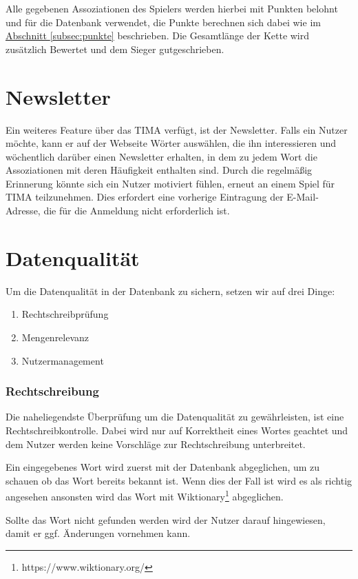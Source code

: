 Alle gegebenen Assoziationen des Spielers werden hierbei mit Punkten belohnt
und für die Datenbank verwendet, die Punkte berechnen sich dabei wie im \hyperref[subsec:punkte]{Abschnitt \ref*{subsec:punkte}} beschrieben. Die Gesamtlänge der Kette wird zusätzlich Bewertet und dem Sieger gutgeschrieben.

\section{Newsletter}\label{subsec:newsletter}
Ein weiteres Feature über das TIMA verfügt, ist der Newsletter. Falls ein
Nutzer möchte, kann er auf der Webseite Wörter auswählen, die ihn
interessieren und wöchentlich darüber einen Newsletter erhalten, in dem zu
jedem Wort die Assoziationen mit deren Häufigkeit enthalten sind. Durch die
regelmäßig Erinnerung könnte sich ein Nutzer motiviert fühlen, erneut an einem
Spiel für TIMA teilzunehmen. Dies erfordert eine vorherige Eintragung der E-Mail-Adresse, die für die Anmeldung nicht erforderlich ist.

\section{Datenqualität}
Um die Datenqualität  in der Datenbank zu sichern, setzen wir auf drei Dinge:

\begin{enumerate}
	\item Rechtschreibprüfung
	\item Mengenrelevanz
	\item Nutzermanagement
\end{enumerate}

\subsubsection{Rechtschreibung}
Die naheliegendste Überprüfung um die Datenqualität zu gewährleisten, ist eine
Rechtschreibkontrolle. Dabei wird nur auf Korrektheit eines Wortes geachtet und dem Nutzer werden keine Vorschläge zur Rechtschreibung unterbreitet.

Ein eingegebenes Wort wird zuerst mit der Datenbank abgeglichen, um zu schauen ob das Wort bereits bekannt ist. Wenn dies der Fall ist wird es als richtig angesehen ansonsten wird das Wort mit Wiktionary\footnote{https://www.wiktionary.org/} abgeglichen.

Sollte das Wort nicht gefunden werden wird der Nutzer darauf hingewiesen, damit er ggf. Änderungen vornehmen kann.

